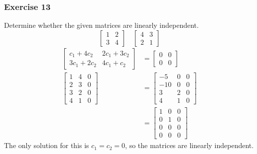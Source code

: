 \documentclass{math}
\begin{document}
\subsubsection*{Exercise 13}
Determine whether the given matrices are linearly independent.
\[ \begin{bmatrix}1 & 2 \\ 3 & 4\end{bmatrix} \quad
  \begin{bmatrix}4 & 3 \\ 2 & 1\end{bmatrix} \]
\begin{align*}
  \begin{bmatrix}
    c_1+4c_2 & 2c_1+3c_2 \\
    3c_1+2c_2 & 4c_1+c_2
  \end{bmatrix} &= \begin{bmatrix}
    0 & 0 \\
    0 & 0
  \end{bmatrix} \\
  \begin{bmatrix}
    1 & 4 & 0 \\
    2 & 3 & 0 \\
    3 & 2 & 0 \\
    4 & 1 & 0
  \end{bmatrix} &= \begin{bmatrix}
    -5 & 0 & 0 \\
    -10 & 0 & 0 \\
    3 & 2 & 0 \\
    4 & 1 & 0
  \end{bmatrix} \\
  &= \begin{bmatrix}
    1 & 0 & 0 \\
    0 & 1 & 0 \\
    0 & 0 & 0 \\
    0 & 0 & 0
  \end{bmatrix}
\end{align*}
The only solution for this is \( c_1 = c_2 = 0 \), so the matrices are linearly
independent.
\end{document}
